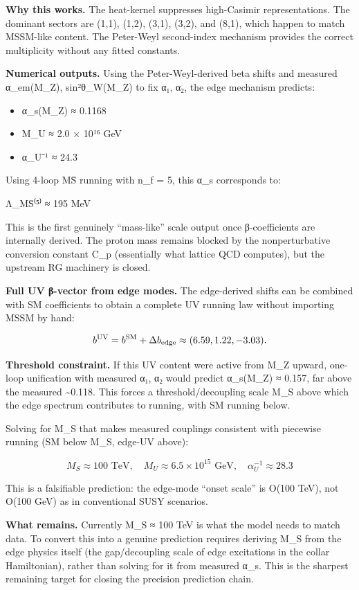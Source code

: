 \documentclass[
]{article}
\providecommand{\tightlist}{%
  \setlength{\itemsep}{0pt}\setlength{\parskip}{0pt}}
\begin{document}
\textbf{Why this works.} The heat-kernel suppresses high-Casimir
representations. The dominant sectors are (1,1), (1,2), (3,1), (3,2),
and (8,1), which happen to match MSSM-like content. The Peter-Weyl
second-index mechanism provides the correct multiplicity without any
fitted constants.

\textbf{Numerical outputs.} Using the Peter-Weyl-derived beta shifts and
measured α\_em(M\_Z), sin²θ\_W(M\_Z) to fix α₁, α₂, the edge mechanism
predicts:

\begin{itemize}
\tightlist
\item
  α\_s(M\_Z) ≈ 0.1168
\item
  M\_U ≈ 2.0 × 10¹⁶ GeV
\item
  α\_U⁻¹ ≈ 24.3
\end{itemize}

Using 4-loop MS̄ running with n\_f = 5, this α\_s corresponds to:

Λ\_MS̄⁽⁵⁾ ≈ 195 MeV

This is the first genuinely ``mass-like'' scale output once
β-coefficients are internally derived. The proton mass remains blocked
by the nonperturbative conversion constant C\_p (essentially what
lattice QCD computes), but the upstream RG machinery is closed.

\textbf{Full UV β-vector from edge modes.} The edge-derived shifts can
be combined with SM coefficients to obtain a complete UV running law
without importing MSSM by hand:

\[
b^{\rm UV} = b^{\rm SM} + \Delta b_{\rm edge} \approx (6.59, 1.22, -3.03).
\]

\textbf{Threshold constraint.} If this UV content were active from M\_Z
upward, one-loop unification with measured α₁, α₂ would predict
α\_s(M\_Z) ≈ 0.157, far above the measured \textasciitilde0.118. This
forces a threshold/decoupling scale M\_S above which the edge spectrum
contributes to running, with SM running below.

Solving for M\_S that makes measured couplings consistent with piecewise
running (SM below M\_S, edge-UV above):

\[
M_S \approx 100 \text{ TeV}, \quad M_U \approx 6.5 \times 10^{15} \text{ GeV}, \quad \alpha_U^{-1} \approx 28.3
\]

This is a falsifiable prediction: the edge-mode ``onset scale'' is O(100
TeV), not O(100 GeV) as in conventional SUSY scenarios.

\textbf{What remains.} Currently M\_S ≈ 100 TeV is what the model needs
to match data. To convert this into a genuine prediction requires
deriving M\_S from the edge physics itself (the gap/decoupling scale of
edge excitations in the collar Hamiltonian), rather than solving for it
from measured α\_s. This is the sharpest remaining target for closing
the precision prediction chain.
\end{document}
